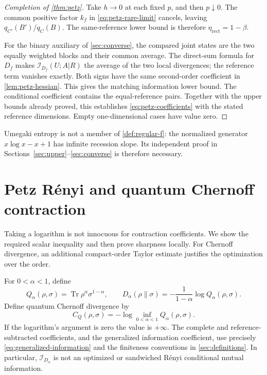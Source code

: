 \documentclass[11pt]{article}
\numberwithin{equation}{section}
\theoremstyle{definition}
\theoremstyle{remark}
\DeclareMathOperator{\Tr}{Tr}
\begin{document}
\begin{proof}[Completion of \cref{thm:petz}]
Take $h\to0$ at each fixed $p$, and then $p\downarrow0$.
The common positive factor $k_f$ in
\eqref{eq:petz-rare-limit} cancels, leaving
$q_{C'}(B')/q_C(B)$. The same-reference lower bound is therefore
$\eta_{\mathrm{rect}}=1-\beta$.

For the binary auxiliary of \cref{sec:converse}, the compared joint
states are the two equally weighted blocks and their common average.
The direct-sum formula for $D_f$ makes
$\mathcal I_{D_f}(U;A|R)$ the average of the two local divergences;
the reference term vanishes exactly. Both signs have the same
second-order coefficient in \cref{lem:petz-hessian}. This gives the
matching information lower bound. The conditional coefficient contains
the equal-reference pairs. Together with the upper bounds already
proved, this establishes \eqref{eq:petz-coefficients} with the stated
reference dimensions. Empty one-dimensional cases have value zero.
\end{proof}

Umegaki entropy is not a member of \cref{def:regular-f}: the normalized
generator $x\log x-x+1$ has infinite recession slope. Its independent
proof in Sections~\ref{sec:upper}--\ref{sec:converse} is therefore
necessary.

\section{Petz R\'enyi and quantum Chernoff contraction}
\label{sec:logarithmic}

Taking a logarithm is not innocuous for contraction coefficients. We show the
required scalar inequality and then prove sharpness locally. For Chernoff
divergence, an additional compact-order Taylor estimate justifies the
optimization over the order.

For $0<\alpha<1$, define
\[
 Q_\alpha(\rho,\sigma)=\Tr\rho^\alpha\sigma^{1-\alpha},\qquad
 D_\alpha(\rho\|\sigma)=-\frac1{1-\alpha}\log Q_\alpha(\rho,\sigma).
\]
Define quantum Chernoff divergence by
\[
 C_Q(\rho,\sigma)=-\log\inf_{0<\alpha<1}Q_\alpha(\rho,\sigma).
\]
If the logarithm's argument is zero the value is $+\infty$.
The complete and reference-subtracted coefficients, and the generalized
information coefficient, use precisely
\eqref{eq:generalized-information} and the finiteness conventions in
\cref{sec:definitions}. In particular, $\mathcal I_{D_\alpha}$ is not an
optimized or sandwiched R\'enyi conditional mutual information.
\end{document}
